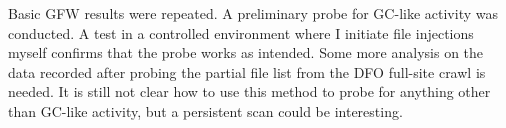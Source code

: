 Basic GFW results were repeated.
A preliminary probe for GC-like activity was conducted.
A test in a controlled environment where I initiate file injections myself confirms that the probe works as intended.
Some more analysis on the data recorded after probing the partial file list from the DFO full-site crawl is needed.
It is still not clear how to use this method to probe for anything other than GC-like activity, but a persistent scan could be interesting.